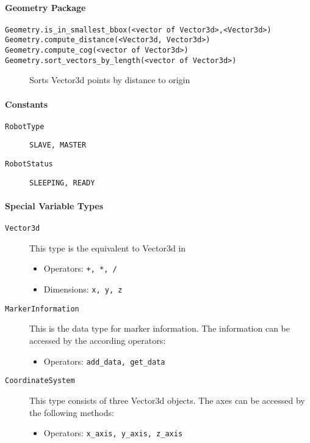 \paragraph{Geometry Package}
\begin{description}
	\item [\texttt{Geometry.is\_in\_smallest\_bbox(<vector of Vector3d>,<Vector3d>)}]
	\item [\texttt{Geometry.compute\_distance(<Vector3d, Vector3d>)}]
	\item [\texttt{Geometry.compute\_cog(<vector of Vector3d>)}]
	\item [\texttt{Geometry.sort\_vectors\_by\_length(<vector of Vector3d>)}] Sorts Vector3d points by distance to origin
\end{description}


\paragraph{\Lua Constants}
\begin{description}
	\item [\texttt{RobotType}] \texttt{SLAVE, MASTER}
	\item [\texttt{RobotStatus}] \texttt{SLEEPING, READY}
\end{description}

\paragraph{Special Variable Types}
\begin{description}
	\item [\texttt{Vector3d}] This type is the \Lua equivalent to Vector3d in \RSS
	\begin{itemize}
		\item Operators: \texttt{+, *, /}
		\item Dimensions: \texttt{x, y, z}
	\end{itemize}
	\item [\texttt{MarkerInformation}] This is the data type for marker information. The information can be accessed by the according operators:
	\begin{itemize}
		\item Operators: \texttt{add\_data, get\_data}
	\end{itemize}
	\item [\texttt{CoordinateSystem}] This type consists of three Vector3d objects. The axes can be accessed by the following methods:
	\begin{itemize}
		\item Operators: \texttt{x\_axis, y\_axis, z\_axis}
	\end{itemize}

\end{description}


